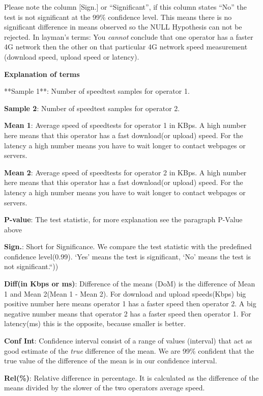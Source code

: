 \documentclass[]{article}
\begin{document}
Please note the column {[}Sign.{]} or ``Significant'', if this column
states ``No'' the test is not significant at the 99\% confidence level.
This means there is no significant difference in means observed so the
NULL Hypothesis can not be rejected. In layman's terms: You
\emph{cannot} conclude that one operator has a faster 4G network then
the other on that particular 4G network speed measurement (download
speed, upload speed or latency).

\textbf{Explanation of terms}

\footnotesize
**Sample 1**: Number of speedtest samples for operator 1.

\textbf{Sample 2}: Number of speedtest samples for operator 2.

\textbf{Mean 1}: Average speed of speedtests for operator 1 in KBps. A
high number here means that this operator has a fast download(or upload)
speed. For the latency a high number means you have to wait longer to
contact webpages or servers.

\textbf{Mean 2}: Average speed of speedtests for operator 2 in KBps. A
high number here means that this operator has a fast download(or upload)
speed. For the latency a high number means you have to wait longer to
contact webpages or servers.

\textbf{P-value}: The test statistic, for more explanation see the
paragraph P-Value above

\textbf{Sign.}: Short for Significance. We compare the test statistic
with the predefined confidence level(0.99). `Yes' means the test is
significant, `No' means the test is not significant.``))

\textbf{Diff(in Kbps or ms)}: Difference of the means (DoM) is the
difference of Mean 1 and Mean 2(Mean 1 - Mean 2). For download and
upload speeds(Kbps) big positive number here means operator 1 has a
faster speed then operator 2. A big negative number means that operator
2 has a faster speed then operator 1. For latency(ms) this is the
opposite, because smaller is better.

\textbf{Conf Int}: Confidence interval consist of a range of values
(interval) that act as good estimate of the \emph{true} difference of
the mean. We are 99\% confident that the true value of the difference of
the mean is in our confidence interval.

\textbf{Rel(\%)}: Relative difference in percentage. It is calculated as
the difference of the means divided by the slower of the two operators
average speed.

\normalsize
\end{document}
